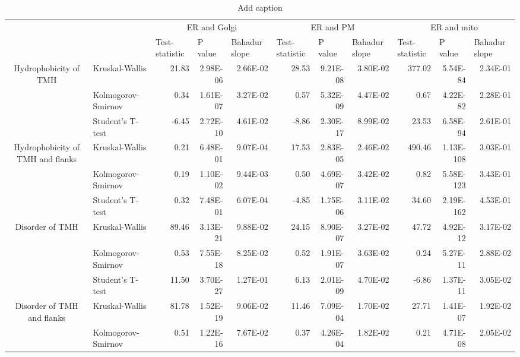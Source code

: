 \begin{table}[htbp]
  \centering
  \caption{Add caption}
    \begin{tabular}{clrrrrrrrrr}
          &       & \multicolumn{3}{c}{ER and Golgi} & \multicolumn{3}{c}{ER and PM} & \multicolumn{3}{c}{ER and mito} \\
          &       & \multicolumn{1}{l}{ Test-statistic} & \multicolumn{1}{l}{ P value} & \multicolumn{1}{l}{ Bahadur slope} & \multicolumn{1}{l}{ Test-statistic} & \multicolumn{1}{l}{ P value} & \multicolumn{1}{l}{ Bahadur slope} & \multicolumn{1}{l}{ Test-statistic} & \multicolumn{1}{l}{ P value} & \multicolumn{1}{l}{ Bahadur slope} \\
    \multirow{3}[0]{*}{Hydrophobicity of TMH } &  Kruskal-Wallis & 21.83 & 2.98E-06 & 2.66E-02 & 28.53 & 9.21E-08 & 3.80E-02 & 377.02 & 5.54E-84 & 2.34E-01 \\
          &  Kolmogorov-Smirnov & 0.34  & 1.61E-07 & 3.27E-02 & 0.57  & 5.32E-09 & 4.47E-02 & 0.67  & 4.22E-82 & 2.28E-01 \\
          &  Student's T-test & -6.45 & 2.72E-10 & 4.61E-02 & -8.86 & 2.30E-17 & 8.99E-02 & 23.53 & 6.58E-94 & 2.61E-01 \\
    \multirow{3}[0]{*}{Hydrophobicity of TMH and flanks } &  Kruskal-Wallis & 0.21  & 6.48E-01 & 9.07E-04 & 17.53 & 2.83E-05 & 2.46E-02 & 490.46 & 1.13E-108 & 3.03E-01 \\
          &  Kolmogorov-Smirnov & 0.19  & 1.10E-02 & 9.44E-03 & 0.50  & 4.69E-07 & 3.42E-02 & 0.82  & 5.58E-123 & 3.43E-01 \\
          &  Student's T-test & 0.32  & 7.48E-01 & 6.07E-04 & -4.85 & 1.75E-06 & 3.11E-02 & 34.60 & 2.19E-162 & 4.53E-01 \\
    \multirow{3}[0]{*}{Disorder of TMH } &  Kruskal-Wallis & 89.46 & 3.13E-21 & 9.88E-02 & 24.15 & 8.90E-07 & 3.27E-02 & 47.72 & 4.92E-12 & 3.17E-02 \\
          &  Kolmogorov-Smirnov & 0.53  & 7.55E-18 & 8.25E-02 & 0.52  & 1.91E-07 & 3.63E-02 & 0.24  & 5.27E-11 & 2.88E-02 \\
          &  Student's T-test & 11.50 & 3.70E-27 & 1.27E-01 & 6.13  & 2.01E-09 & 4.70E-02 & -6.86 & 1.37E-11 & 3.05E-02 \\
    \multirow{3}[0]{*}{Disorder of TMH and flanks } &  Kruskal-Wallis & 81.78 & 1.52E-19 & 9.06E-02 & 11.46 & 7.09E-04 & 1.70E-02 & 27.71 & 1.41E-07 & 1.92E-02 \\
          &  Kolmogorov-Smirnov & 0.51  & 1.22E-16 & 7.67E-02 & 0.37  & 4.26E-04 & 1.82E-02 & 0.21  & 4.71E-08 & 2.05E-02 \\

\end{tabular}
\end{table}

